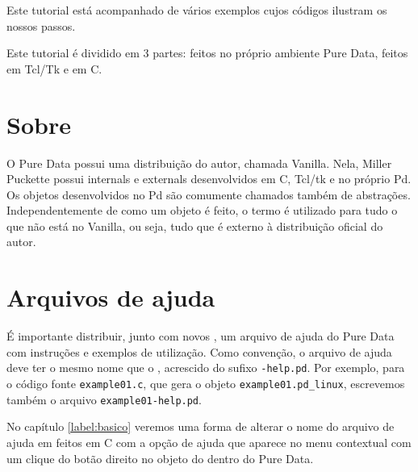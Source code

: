 Este tutorial está acompanhado de vários exemplos cujos códigos ilustram os nossos
passos.

Este tutorial é dividido em 3 partes: \externals feitos no próprio ambiente Pure
Data, feitos em Tcl/Tk e em C.

\section{Sobre \Externals}
O Pure Data possui uma distribuição do autor, chamada Vanilla.
Nela, Miller Puckette possui internals e externals desenvolvidos em C, Tcl/tk e
no próprio Pd.
Os objetos desenvolvidos no Pd são comumente chamados também de abstrações.
Independentemente de como um objeto é feito, o termo \external é utilizado para
tudo o que não está no Vanilla, ou seja, tudo que é externo à distribuição
oficial do autor.

\section{Arquivos de ajuda}

É importante distribuir, junto com novos \externals, um arquivo de ajuda do
Pure Data com instruções e exemplos de utilização. Como convenção, o arquivo
de ajuda deve ter o mesmo nome que o \external, acrescido do sufixo
\texttt{-help.pd}. Por exemplo, para o código fonte \texttt{example01.c}, que
gera o objeto \texttt{example01.pd\_linux}, escrevemos também o arquivo
\texttt{example01-help.pd}.


No capítulo \ref{label:basico} veremos uma forma de alterar o nome do arquivo de
ajuda em \externals feitos em C com a opção de ajuda que aparece no menu
contextual com um clique do botão direito no objeto do \external dentro do Pure Data.

